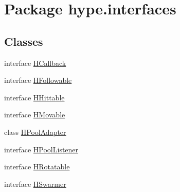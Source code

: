 \hypertarget{namespacehype_1_1interfaces}{\section{Package hype.\-interfaces}
\label{namespacehype_1_1interfaces}
}
\subsection*{Classes}
\begin{DoxyCompactItemize}
\item 
interface \hyperlink{interfacehype_1_1interfaces_1_1_h_callback}{H\-Callback}
\item 
interface \hyperlink{interfacehype_1_1interfaces_1_1_h_followable}{H\-Followable}
\item 
interface \hyperlink{interfacehype_1_1interfaces_1_1_h_hittable}{H\-Hittable}
\item 
interface \hyperlink{interfacehype_1_1interfaces_1_1_h_movable}{H\-Movable}
\item 
class \hyperlink{classhype_1_1interfaces_1_1_h_pool_adapter}{H\-Pool\-Adapter}
\item 
interface \hyperlink{interfacehype_1_1interfaces_1_1_h_pool_listener}{H\-Pool\-Listener}
\item 
interface \hyperlink{interfacehype_1_1interfaces_1_1_h_rotatable}{H\-Rotatable}
\item 
interface \hyperlink{interfacehype_1_1interfaces_1_1_h_swarmer}{H\-Swarmer}
\end{DoxyCompactItemize}
